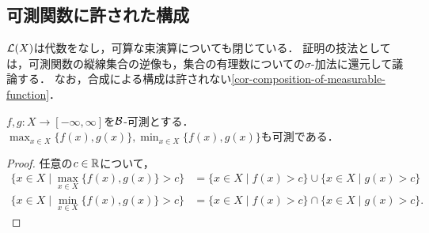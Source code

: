 \documentclass[uplatex, dvipdfmx]{jsreport}
\begin{document}
\subsection{可測関数に許された構成}

\begin{tcolorbox}[colframe=ForestGreen, colback=ForestGreen!10!white,breakable,colbacktitle=ForestGreen!40!white,coltitle=black,fonttitle=\bfseries\sffamily,
title=]
    $\L(X)$は代数をなし，可算な束演算についても閉じている．
    証明の技法としては，可測関数の縦線集合の逆像も，集合の有理数についての$\sigma$-加法に還元して議論する．
    なお，合成による構成は許されない\ref{cor-composition-of-measurable-function}．
\end{tcolorbox}

\begin{proposition}[$\L(X)$は関数束をなす]
    $f,g:X\to[-\infty,\infty]$を$\mathcal{B}$-可測とする．$\max_{x\in X}\{f(x),g(x)\},\min_{x\in X}\{f(x),g(x)\}$も可測である．
\end{proposition}
\begin{proof}
    任意の$c\in\mathbb{R}$について，
    \begin{align*}
        \{x\in X\mid\max_{x\in X}\{f(x),g(x)\}>c\}&=\{x\in X\mid f(x)>c\}\cup\{x\in X\mid g(x)>c\}\\
        \{x\in X\mid\min_{x\in X}\{f(x),g(x)\}>c\}&=\{x\in X\mid f(x)>c\}\cap\{x\in X\mid g(x)>c\}.
    \end{align*}
\end{proof}
\end{document}
